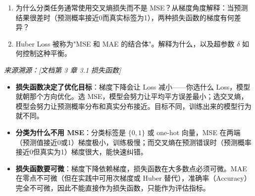 \documentclass[a4paper,11pt]{ctexart}
\begin{document}
\begin{problembox}
\begin{enumerate}[(1)]
        \item 为什么分类任务通常使用交叉熵损失而不是 MSE？从梯度角度解释：当预测结果很差时（预测概率接近0而真实标签为1），两种损失函数的梯度有何差异？

        \item Huber Loss 被称为"MSE 和 MAE 的结合体"。解释为什么，以及超参数 $\delta$ 如何控制这种平衡。
    \end{enumerate}

    \vspace{0.2cm}
    {\color{gray}\small\textit{来源溯源：[文档第 3 章 3.1 损失函数]}}
\end{problembox}

\begin{beginnerbox}
    \begin{itemize}
        \item \textbf{损失函数决定了优化目标}：梯度下降会让 Loss 减小——你选什么 Loss，模型就朝那个方向优化。选 MSE，模型会努力让平均平方误差最小；选交叉熵，模型会努力让预测概率分布和真实分布接近。目标不同，训练出来的模型行为就不同。
        \item \textbf{分类为什么不用 MSE}：分类标签是 $\{0, 1\}$ 或 one-hot 向量，MSE 在两端（预测值接近0或1）梯度极小，训练极慢；而交叉熵在预测错误时（预测概率接近0但真实为1）梯度很大，能快速纠错。
        \item \textbf{损失函数要可微}：梯度下降依赖梯度，损失函数在大多数点必须可微。MAE 在零点不可微（但在实践中可用次梯度或 Huber 替代），准确率（Accuracy）完全不可微，因此不能直接作为损失函数，只能作为评估指标。
    \end{itemize}
\end{beginnerbox}
\end{document}
